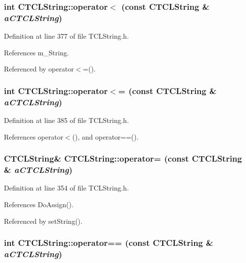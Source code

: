 \subsubsection{\setlength{\rightskip}{0pt plus 5cm}int CTCLString::operator$<$ (const CTCLString \& {\em a\-CTCLString})\hspace{0.3cm}{\tt  [inline]}}\label{classCTCLString_a10}




Definition at line 377 of file TCLString.h.

References m\_\-String.

Referenced by operator$<$=().
\subsubsection{\setlength{\rightskip}{0pt plus 5cm}int CTCLString::operator$<$= (const CTCLString \& {\em a\-CTCLString})\hspace{0.3cm}{\tt  [inline]}}\label{classCTCLString_a12}




Definition at line 385 of file TCLString.h.

References operator$<$(), and operator==().
\subsubsection{\setlength{\rightskip}{0pt plus 5cm}CTCLString\& CTCLString::operator= (const CTCLString \& {\em a\-CTCLString})\hspace{0.3cm}{\tt  [inline]}}\label{classCTCLString_a6}




Definition at line 354 of file TCLString.h.

References Do\-Assign().

Referenced by set\-String().
\subsubsection{\setlength{\rightskip}{0pt plus 5cm}int CTCLString::operator== (const CTCLString \& {\em a\-CTCLString})\hspace{0.3cm}{\tt  [inline]}}\label{classCTCLString_a7}




